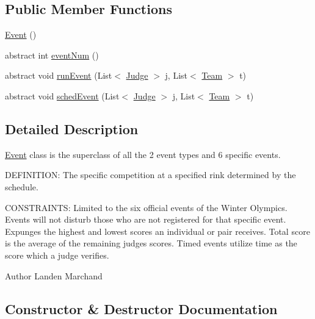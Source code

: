 \subsection*{Public Member Functions}
\begin{DoxyCompactItemize}
\item 
\hyperlink{classProject__Codename__Olympia__v1_1_1__0_1_1Event_a1ad8588cb7e2442f64ee90ca32614f85}{Event} ()
\item 
abstract int \hyperlink{classProject__Codename__Olympia__v1_1_1__0_1_1Event_ad1154ef4dd1dec29d8ebf5614d84b1f3}{event\+Num} ()
\item 
abstract void \hyperlink{classProject__Codename__Olympia__v1_1_1__0_1_1Event_ac6ff060da23153c02da49937dcf9f326}{run\+Event} (List$<$ \hyperlink{classProject__Codename__Olympia__v1_1_1__0_1_1Judge}{Judge} $>$ j, List$<$ \hyperlink{classProject__Codename__Olympia__v1_1_1__0_1_1Team}{Team} $>$ t)
\item 
abstract void \hyperlink{classProject__Codename__Olympia__v1_1_1__0_1_1Event_abb4e2b9c28527b9a28395f2fe9192196}{sched\+Event} (List$<$ \hyperlink{classProject__Codename__Olympia__v1_1_1__0_1_1Judge}{Judge} $>$ j, List$<$ \hyperlink{classProject__Codename__Olympia__v1_1_1__0_1_1Team}{Team} $>$ t)
\end{DoxyCompactItemize}


\subsection{Detailed Description}
\hyperlink{classProject__Codename__Olympia__v1_1_1__0_1_1Event}{Event} class is the superclass of all the 2 event types and 6 specific events. 

D\+E\+F\+I\+N\+I\+T\+I\+ON\+: The specific competition at a specified rink determined by the schedule.

C\+O\+N\+S\+T\+R\+A\+I\+N\+TS\+: Limited to the six official events of the Winter Olympics. Events will not disturb those who are not registered for that specific event. Expunges the highest and lowest scores an individual or pair receives. Total score is the average of the remaining judges scores. Timed events utilize time as the score which a judge verifies.\begin{DoxyAuthor}{Author}
Landen Marchand 
\end{DoxyAuthor}


\subsection{Constructor \& Destructor Documentation}
\mbox{\label{classProject__Codename__Olympia__v1_1_1__0_1_1Event_a1ad8588cb7e2442f64ee90ca32614f85}} 
